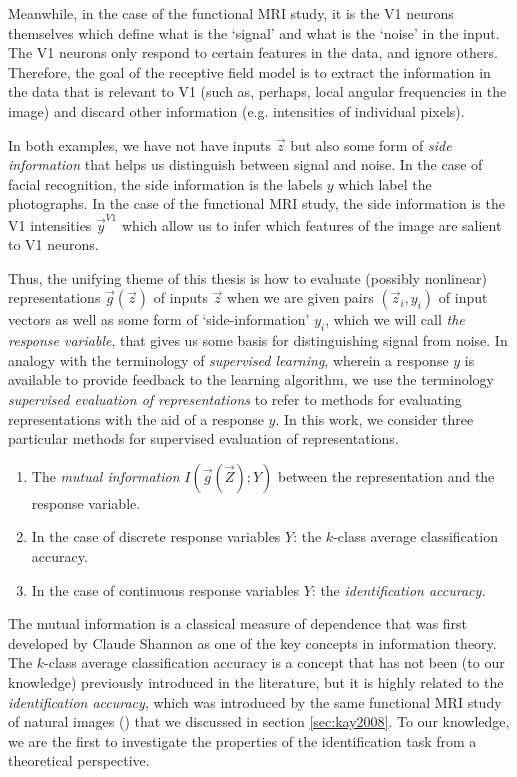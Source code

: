 Meanwhile, in the case of the functional MRI study, it is the V1
neurons themselves which define what is the `signal' and what is the
`noise' in the input.  The V1 neurons only respond to certain features
in the data, and ignore others.  Therefore, the goal of the receptive
field model is to extract the information in the data that is relevant
to V1 (such as, perhaps, local angular frequencies in the image) and
discard other information (e.g. intensities of individual pixels).

In both examples, we have not have inputs $\vec{z}$ but also some form
of \emph{side information} that helps us distinguish between signal
and noise.  In the case of facial recognition, the side information is
the labels $y$ which label the photographs.  In the case of the
functional MRI study, the side information is the V1 intensities
$\vec{y}^{V1}$ which allow us to infer which features of the image 
are salient to V1 neurons.

Thus, the unifying theme of this thesis is how to evaluate (possibly
nonlinear) representations $\vec{g}(\vec{z})$ of inputs $\vec{z}$ when
we are given pairs $(\vec{z}_i, y_i)$ of input vectors as well as some
form of `side-information' $y_i$, which we will call \emph{the
  response variable}, that gives us some basis for distinguishing
signal from noise.  In analogy with the terminology of
\emph{supervised learning}, wherein a response $y$ is available to
provide feedback to the learning algorithm, we use the terminology
\emph{supervised evaluation of representations} to refer to methods
for evaluating representations with the aid of a response $y$.  In
this work, we consider three particular methods for supervised
evaluation of representations.

\begin{enumerate}
\item The \emph{mutual information} $I(\vec{g}(\vec{Z}); Y)$ between the representation
and the response variable.
\item In the case of discrete response variables $Y$: 
the $k$-class average classification accuracy.
\item In the case of continuous response variables $Y$:
the \emph{identification accuracy.}
\end{enumerate}

The mutual information is a classical measure of dependence that was
first developed by Claude Shannon as one of the key concepts in
information theory.  The $k$-class average classification accuracy is
a concept that has not been (to our knowledge) previously introduced
in the literature, but it is highly related to the
\emph{identification accuracy}, which was introduced by the same
functional MRI study of natural images (\cite{Kay2008a}) that we
discussed in section \ref{sec:kay2008}.  To our knowledge, we are the
first to investigate the properties of the identification task from a
theoretical perspective.

